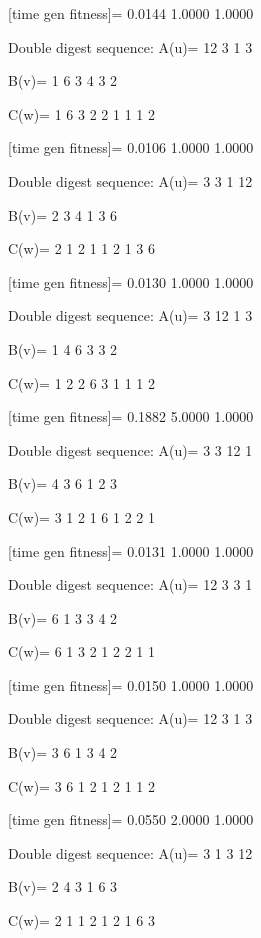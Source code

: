 [time gen fitness]=
    0.0144    1.0000    1.0000

Double digest sequence:
A(u)=
    12     3     1     3

B(v)=
     1     6     3     4     3     2

C(w)=
     1     6     3     2     2     1     1     1     2

[time gen fitness]=
    0.0106    1.0000    1.0000

Double digest sequence:
A(u)=
     3     3     1    12

B(v)=
     2     3     4     1     3     6

C(w)=
     2     1     2     1     1     2     1     3     6

[time gen fitness]=
    0.0130    1.0000    1.0000

Double digest sequence:
A(u)=
     3    12     1     3

B(v)=
     1     4     6     3     3     2

C(w)=
     1     2     2     6     3     1     1     1     2

[time gen fitness]=
    0.1882    5.0000    1.0000

Double digest sequence:
A(u)=
     3     3    12     1

B(v)=
     4     3     6     1     2     3

C(w)=
     3     1     2     1     6     1     2     2     1

[time gen fitness]=
    0.0131    1.0000    1.0000

Double digest sequence:
A(u)=
    12     3     3     1

B(v)=
     6     1     3     3     4     2

C(w)=
     6     1     3     2     1     2     2     1     1

[time gen fitness]=
    0.0150    1.0000    1.0000

Double digest sequence:
A(u)=
    12     3     1     3

B(v)=
     3     6     1     3     4     2

C(w)=
     3     6     1     2     1     2     1     1     2

[time gen fitness]=
    0.0550    2.0000    1.0000

Double digest sequence:
A(u)=
     3     1     3    12

B(v)=
     2     4     3     1     6     3

C(w)=
     2     1     1     2     1     2     1     6     3

